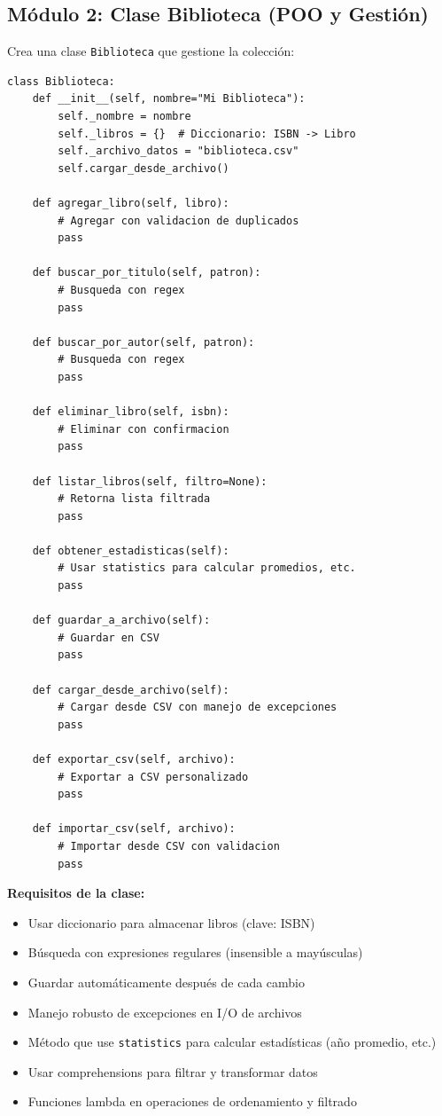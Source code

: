 \documentclass[12pt,a4paper]{article}
\begin{document}
\subsection{Módulo 2: Clase Biblioteca (POO y Gestión)}

Crea una clase \texttt{Biblioteca} que gestione la colección:

\begin{lstlisting}[caption=Estructura de la clase Biblioteca]
class Biblioteca:
    def __init__(self, nombre="Mi Biblioteca"):
        self._nombre = nombre
        self._libros = {}  # Diccionario: ISBN -> Libro
        self._archivo_datos = "biblioteca.csv"
        self.cargar_desde_archivo()
    
    def agregar_libro(self, libro):
        # Agregar con validacion de duplicados
        pass
    
    def buscar_por_titulo(self, patron):
        # Busqueda con regex
        pass
    
    def buscar_por_autor(self, patron):
        # Busqueda con regex
        pass
    
    def eliminar_libro(self, isbn):
        # Eliminar con confirmacion
        pass
    
    def listar_libros(self, filtro=None):
        # Retorna lista filtrada
        pass
    
    def obtener_estadisticas(self):
        # Usar statistics para calcular promedios, etc.
        pass
    
    def guardar_a_archivo(self):
        # Guardar en CSV
        pass
    
    def cargar_desde_archivo(self):
        # Cargar desde CSV con manejo de excepciones
        pass
    
    def exportar_csv(self, archivo):
        # Exportar a CSV personalizado
        pass
    
    def importar_csv(self, archivo):
        # Importar desde CSV con validacion
        pass
\end{lstlisting}

\textbf{Requisitos de la clase:}
\begin{itemize}[leftmargin=*]
    \item Usar diccionario para almacenar libros (clave: ISBN)
    \item Búsqueda con expresiones regulares (insensible a mayúsculas)
    \item Guardar automáticamente después de cada cambio
    \item Manejo robusto de excepciones en I/O de archivos
    \item Método que use \texttt{statistics} para calcular estadísticas (año promedio, etc.)
    \item Usar comprehensions para filtrar y transformar datos
    \item Funciones lambda en operaciones de ordenamiento y filtrado
\end{itemize}
\end{document}
